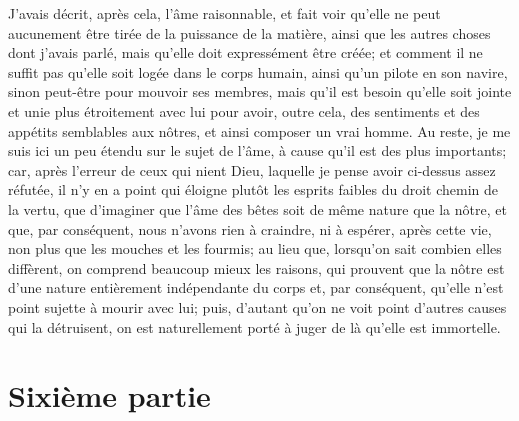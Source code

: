 \documentclass[french,twoside]{book} %
\newcommand\chapteropen{} %
\newcommand\chapterclose{} %
\begin{document}
J'avais décrit, après cela, l'âme raisonnable, et fait voir qu'elle ne peut aucunement être tirée de la puissance de la matière, ainsi que les autres choses dont j'avais parlé, mais qu'elle doit expressément être créée; et comment il ne suffit pas qu'elle soit logée dans le corps humain, ainsi qu'un pilote en son navire, sinon peut-être pour mouvoir ses membres, mais qu'il est besoin qu'elle soit jointe et unie plus étroitement avec lui pour avoir, outre cela, des sentiments et des appétits semblables aux nôtres, et ainsi composer un vrai homme. Au reste, je me suis ici un peu étendu sur le sujet de l'âme, à cause qu'il est des plus importants; car, après l'erreur de ceux qui nient Dieu, laquelle je pense avoir ci-dessus assez réfutée, il n'y en a point qui éloigne plutôt les esprits faibles du droit chemin de la vertu, que d'imaginer que l'âme des bêtes soit de même nature que la nôtre, et que, par conséquent, nous n'avons rien à craindre, ni à espérer, après cette vie, non plus que les mouches et les fourmis; au lieu que, lorsqu'on sait combien elles diffèrent, on comprend beaucoup mieux les raisons, qui prouvent que la nôtre est d'une nature entièrement indépendante du corps et, par conséquent, qu'elle n'est point sujette à mourir avec lui; puis, d'autant qu'on ne voit point d'autres causes qui la détruisent, on est naturellement porté à juger de là qu'elle est immortelle.
\chapterclose


\chapteropen
\renewcommand{\leftmark}{Sixième partie}
\chapter[Sixième partie]{Sixième partie}
\end{document}
